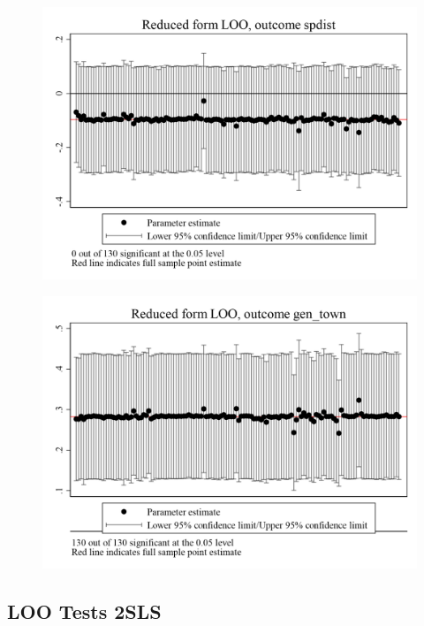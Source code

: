 \documentclass{article}
\begin{document}
\clearpage
\begin{figure}
	\centering
	\includegraphics[width=.8\textwidth]{figures/exogeneity_tests/loo_rf_spdist.png}
\end{figure}
\clearpage
\begin{figure}
	\centering
	\includegraphics[width=.8\textwidth]{figures/exogeneity_tests/loo_rf_gen_town.png}
\end{figure}
\clearpage
\subsection{LOO Tests 2SLS}
\clearpage
\end{document}
